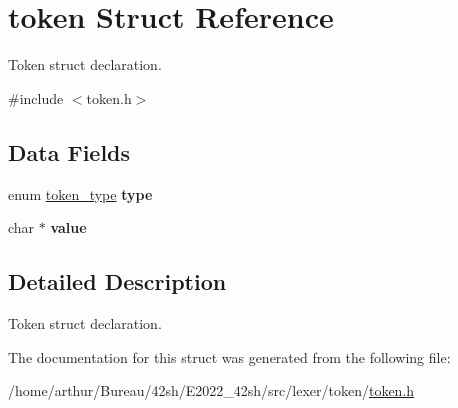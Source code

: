 \hypertarget{structtoken}{}\section{token Struct Reference}
\label{structtoken}


Token struct declaration.  




{\ttfamily \#include $<$token.\+h$>$}

\subsection*{Data Fields}
\begin{DoxyCompactItemize}
\item 
\mbox{\label{structtoken_a239b01722e92fe2ca47a025485e55c7f}} 
enum \hyperlink{token_8h_afe5ef662303b6b710ea6ee1a944bad0d}{token\+\_\+type} {\bfseries type}
\item 
\mbox{\label{structtoken_a4e9aec275e566b978a3ccb4e043d8c61}} 
char $\ast$ {\bfseries value}
\end{DoxyCompactItemize}


\subsection{Detailed Description}
Token struct declaration. 

The documentation for this struct was generated from the following file\+:\begin{DoxyCompactItemize}
\item 
/home/arthur/\+Bureau/42sh/\+E2022\+\_\+42sh/src/lexer/token/\hyperlink{token_8h}{token.\+h}\end{DoxyCompactItemize}
